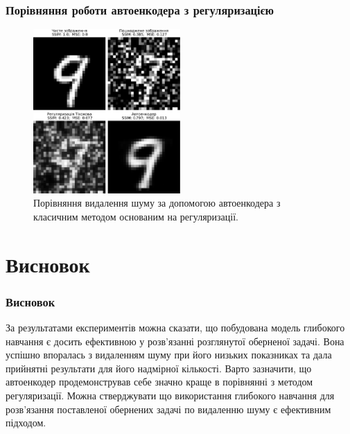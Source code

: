\documentclass{beamer}
\numberwithin{equation}{section}
\newcounter{e}
\numberwithin{equation}{section}
\numberwithin{figure}{section}
\begin{document}
	\begin{frame}
		\frametitle{Порівняння роботи автоенкодера з регуляризацією}
		\begin{figure}[H]
			\centering
			\includegraphics[width=0.5\textwidth]{../resources/denoising-methods-comparation.pdf}
			\caption{Порівняння видалення шуму за допомогою автоенкодера з класичним методом основаним на регуляризації.}
			\label{fig:denoising-methods-comparation}
		\end{figure}
	\end{frame}
	\section{Висновок}	
	\begin{frame}
		\frametitle{Висновок}
		За результатами експериментів можна сказати, що побудована модель глибокого навчання є досить ефективною у розв'язанні розглянутої оберненої задачі. Вона успішно впоралась з видаленням шуму при його низьких показниках та дала прийнятні результати для його надмірної кількості. Варто зазначити, що автоенкодер продемонстрував себе значно краще в порівнянні з методом регуляризації. Можна стверджувати що використання глибокого навчання для розв'язання поставленої обернених задачі по видаленню шуму є ефективним підходом.
	\end{frame}
	\begin{frame}
		\printbibliography[title={Література}]
	\end{frame}
	
	
\end{document}
